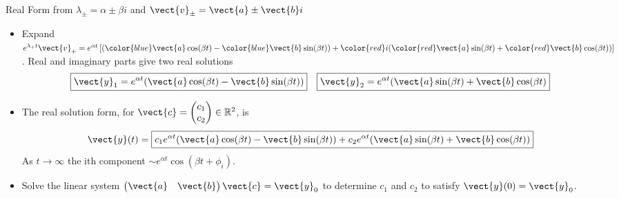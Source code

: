\begin{frame}{Real Form from $\lambda_{\pm}=\alpha\pm\beta i$
and $\vect{v}_{\pm}=\vect{a}\pm\vect{b}i$
}
\begin{itemize}
  \item Expand
  $e^{\lambda_+t}\vect{v}_+
  =e^{\alpha t}\left[
  ({\color{blue}\vect{a}\cos(\beta t)}-{\color{blue}\vect{b}\sin(\beta t)})
  +{\color{red}i}({\color{red}\vect{a}\sin(\beta t)}+{\color{red}\vect{b}\cos(\beta t)})
  \right]$. \newline
  Real and imaginary parts give two real solutions
  \[
    \boxed{\vect{y}_1 = e^{\alpha t}
    	(\vect{a}\cos(\beta t)-\vect{b}\sin(\beta t))}
  \quad
    \boxed{\vect{y}_2 = e^{\alpha t}
    	(\vect{a}\sin(\beta t)+\vect{b}\cos(\beta t)}
  \]
  \item The real solution form, for $\vect{c}=\begin{pmatrix}c_1\\c_2\end{pmatrix}\in\mathbb{R}^2$, is
  \[
  \vect{y}(t)= \boxed{
  	c_1 e^{\alpha t}
  	(\vect{a}\cos(\beta t)-\vect{b}\sin(\beta t))
  	+ 
  	c_2 e^{\alpha t}
  	(\vect{a}\sin(\beta t)+\vect{b}\cos(\beta t))
  }
  \]
  As $t\rightarrow\infty$ the ith component
  $\boxed{\sim e^{\alpha t} \cos(\beta t + \phi_i)}$.  
  \item Solve the linear system
  $\begin{pmatrix}\vect{a}&\vect{b}\end{pmatrix}\vect{c}=\vect{y}_0$
  to determine $c_1$ and $c_2$ to satisfy $\vect{y}(0)=\vect{y}_0$.
\end{itemize}
\end{frame}
